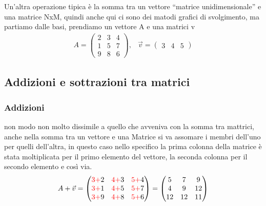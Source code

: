 \documentclass{book}
\begin{document}
Un'altra operazione tipica è la somma tra un vettore ``matrice unidimensionale''
e una matrice NxM, quindi anche qui ci sono dei matodi grafici di svolgimento,
ma partiamo dalle basi, prendiamo un vettore A e una matrici v
\begin{eqnarray}
  \label{eq:vetmatex}
  A =
  \begin{pmatrix}
    2 & 3 & 4\\
    1 & 5 & 7\\
    9 & 8 & 6        
  \end{pmatrix}, & \vec{v}=
                  \begin{pmatrix}
                    3 & 4 & 5
                  \end{pmatrix}
\end{eqnarray}
\clearpage
\subsection{Addizioni e sottrazioni tra matrici}
\label{sec:addesottvandmtx}

\subsubsection{Addizioni}
\label{sec:addvectmtx}
non modo non molto dissimile a quello che avveniva con la somma tra mattrici,
anche nella somma tra un vettore e una Matrice si va assomare i membri dell'uno
per quelli dell'altra, in questo caso nello specifico la prima colonna della
matrice è stata moltiplicata per il primo elemento del vettore, la seconda
colonna per il secondo elemento e così via.
\begin{eqnarray*}
   A+\vec{v} =
  \begin{pmatrix}
    {\color{red}3+}2 & {\color{red}4+}3 & {\color{red}5+}4\\
    {\color{red}3+}1 & {\color{red}4+}5 & {\color{red}5+}7\\
    {\color{red}3+}9 & {\color{red}4+}8 & {\color{red}5+}6        
  \end{pmatrix}=
  \begin{pmatrix}
    5 & 7 & 9\\
    4 & 9 & 12\\
    12 & 12 & 11
  \end{pmatrix}
\end{eqnarray*}
\end{document}
